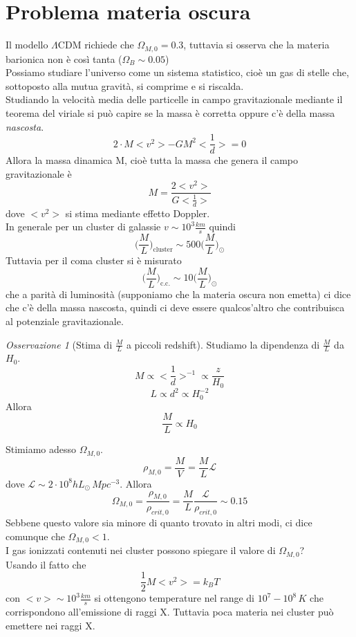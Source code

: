 \documentclass[10pt,a4paper]{article}
\let\oldmarginpar\marginpar
\renewcommand\marginpar[1]{\-\oldmarginpar[\raggedleft\footnotesize #1]%
	{\raggedright\footnotesize #1}}
\theoremstyle{break}
\theoremstyle{remark}
\newtheorem{oss}{Osservazione}
\theoremstyle{definition}
\begin{document}
\section{Problema materia oscura}
Il modello $\Lambda$CDM richiede che $\Omega_{M, 0} = 0.3$, tuttavia si osserva che la materia barionica non è così tanta ($\Omega_B \sim 0.05$) \\
Possiamo studiare l'universo come un sistema statistico, cioè un gas di stelle che, sottoposto alla mutua gravità, si comprime e si riscalda. \\
Studiando la velocità media delle particelle in campo gravitazionale mediante il teorema del viriale si può capire se la massa è corretta oppure c'è della massa \textit{nascosta}.
\[
2\cdot M <v^2> -  G M^2 <\frac1d> = 0
\]
Allora la massa dinamica M, cioè tutta la massa che genera il campo gravitazionale è
\[
M = \frac{2 <v^2>}{G <\frac1d>}
\]
dove $<v^2>$ si stima mediante effetto Doppler. \\
In generale per un cluster di galassie $v \sim 10^3 \frac{km}{s}$ quindi 
\[
\bigg(\frac{M}{L}\bigg)_{\text{cluster}} \sim 500\bigg(\frac{M}{L}\bigg)_\odot
\]
Tuttavia per il coma cluster si è misurato 
\[
\bigg(\frac{M}{L}\bigg)_{\text{c.c.}} \sim 10\bigg(\frac{M}{L}\bigg)_\odot
\]
che a parità di luminosità (supponiamo che la materia oscura non emetta) ci dice che c'è della massa nascosta, quindi ci deve essere qualcos'altro che contribuisca al potenziale gravitazionale.
\begin{oss}[Stima di $\frac{M}{L}$ a piccoli redshift]
	Studiamo la dipendenza di $\frac{M}{L}$ da $H_0$.\\
	\[
	M \propto <\frac1d>^{-1} \propto \frac{z}{H_0}
	\]
	\marginpar{Dalla legge di Hubble $H_0 d = z$}
	\[
	L \propto d^2 \propto H_0^{-2}
	\]
	Allora
	\[
	\frac{M}{L} \propto H_0
	\]
\end{oss}

Stimiamo adesso $\Omega_{M, 0}$.
\[
\rho_{M, 0} = \frac{M}{V} = \frac{M}{L} \mathcal{L}
\]
dove $\mathcal{L} \sim 2\cdot 10^8 h L_\odot\, Mpc^{-3}$. Allora
\[
\Omega_{M, 0} = \frac{\rho_{M, 0}}{\rho_{crit, 0}} = \frac{M}{L} \frac{\mathcal{L}}{\rho_{crit, 0}} \sim 0.15
\]
Sebbene questo valore sia minore di quanto trovato in altri modi, ci dice comunque che $\Omega_{M, 0} < 1$.\\
I gas ionizzati contenuti nei cluster possono spiegare il valore di $\Omega_{M, 0}$?\\
Usando il fatto che 
\[
\frac12 M <v^2> = k_B T
\]
con $<v> \sim 10^3 \frac{km}{s}$ si ottengono temperature nel range di $10^7 - 10^8 \, K$ che corrispondono all'emissione di raggi X. Tuttavia poca materia nei cluster può emettere nei raggi X.
\end{document}
